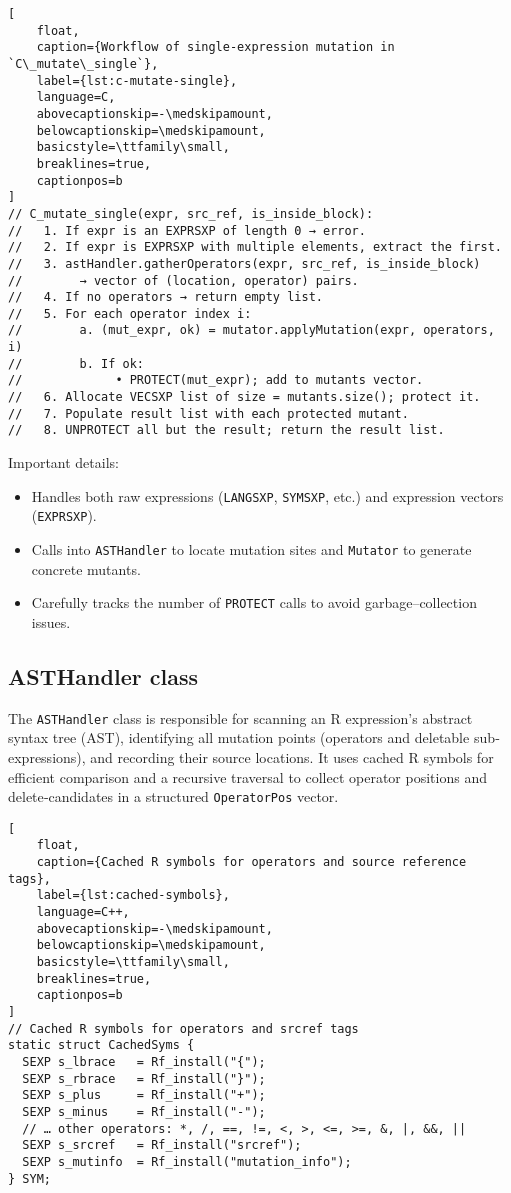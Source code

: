 \begin{lstlisting}[
    float,
    caption={Workflow of single‐expression mutation in `C\_mutate\_single`},
    label={lst:c-mutate-single},
    language=C,
    abovecaptionskip=-\medskipamount,
    belowcaptionskip=\medskipamount,
    basicstyle=\ttfamily\small,
    breaklines=true,
    captionpos=b
]
// C_mutate_single(expr, src_ref, is_inside_block):
//   1. If expr is an EXPRSXP of length 0 → error.
//   2. If expr is EXPRSXP with multiple elements, extract the first.
//   3. astHandler.gatherOperators(expr, src_ref, is_inside_block)
//        → vector of (location, operator) pairs.
//   4. If no operators → return empty list.
//   5. For each operator index i:
//        a. (mut_expr, ok) = mutator.applyMutation(expr, operators, i)
//        b. If ok:
//             • PROTECT(mut_expr); add to mutants vector.
//   6. Allocate VECSXP list of size = mutants.size(); protect it.
//   7. Populate result list with each protected mutant.
//   8. UNPROTECT all but the result; return the result list.
\end{lstlisting}


Important details:
\begin{itemize}
  \item Handles both raw expressions (\texttt{LANGSXP}, \texttt{SYMSXP}, etc.) and expression vectors (\texttt{EXPRSXP}).
  \item Calls into \texttt{ASTHandler} to locate mutation sites and \texttt{Mutator} to generate concrete mutants.
  \item Carefully tracks the number of \texttt{PROTECT} calls to avoid garbage–collection issues.
\end{itemize}


\subsection{ASTHandler class}

The \texttt{ASTHandler} class is responsible for scanning an R expression’s abstract syntax tree (AST), identifying all mutation points (operators and deletable sub‐expressions), and recording their source locations.  It uses cached R symbols for efficient comparison and a recursive traversal to collect operator positions and delete‐candidates in a structured \texttt{OperatorPos} vector.

\begin{lstlisting}[
    float,
    caption={Cached R symbols for operators and source reference tags},
    label={lst:cached-symbols},
    language=C++,
    abovecaptionskip=-\medskipamount,
    belowcaptionskip=\medskipamount,
    basicstyle=\ttfamily\small,
    breaklines=true,
    captionpos=b
]
// Cached R symbols for operators and srcref tags
static struct CachedSyms {
  SEXP s_lbrace   = Rf_install("{");
  SEXP s_rbrace   = Rf_install("}");
  SEXP s_plus     = Rf_install("+");
  SEXP s_minus    = Rf_install("-");
  // … other operators: *, /, ==, !=, <, >, <=, >=, &, |, &&, ||
  SEXP s_srcref   = Rf_install("srcref");
  SEXP s_mutinfo  = Rf_install("mutation_info");
} SYM;
\end{lstlisting}


